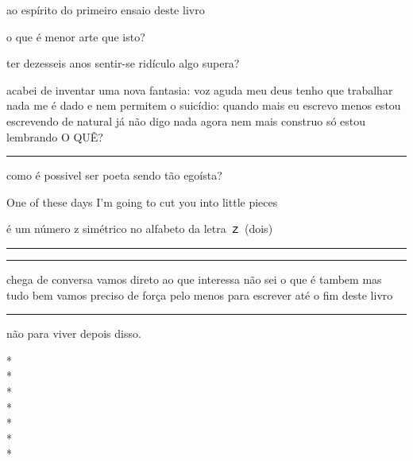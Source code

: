 \begin{poem}
\begin{stanza}
ao espírito \verseline
do primeiro ensaio\verseline
deste livro
\end{stanza}
\begin{stanza}
o que é menor arte\verseline
que isto?
\end{stanza}
\begin{stanza}
ter dezesseis anos\verseline
sentir-se ridículo\verseline
algo supera?
\end{stanza}
\begin{stanza}
acabei de inventar\verseline
uma nova fantasia:\verseline
voz aguda\verseline
meu deus\verseline
tenho que trabalhar\verseline
nada me é dado\verseline
e nem permitem\verseline
o suicídio:\verseline
\qquad quando mais eu escrevo\verseline
\qquad menos estou escrevendo\verseline
de natural já não digo nada\verseline
agora nem mais construo\verseline
\quad só estou lembrando\verseline
\qquad \qquad \qquad \qquad O QUÊ?\verseline
\rule{4cm}{0.4pt} como é\verseline
possivel ser poeta\verseline
sendo tão egoísta? \underline{ } \underline{ } \underline{ } \underline{ } \underline{ } \underline{ } \underline{ }
\end{stanza}
\clearpage
{}
\begin{stanza}
One of these days\verseline
I’m going to cut you\verseline
into little pieces
\end{stanza}
\begin{stanza}
é um número z\verseline
simétrico\verseline
no alfabeto\verseline
da letra ｚ (dois) \rule{6cm}{0.4pt}\verseline
\rule{4cm}{0.4pt} chega de conversa\verseline
vamos direto\verseline
ao que interessa\verseline
não sei o que é tambem\verseline
mas tudo bem\verseline
vamos\verseline
preciso de força\verseline
pelo menos\verseline
para escrever até o fim deste livro\verseline
\rule{2cm}{0.4pt} não para viver depois disso.
\end{stanza}
\end{poem}

\begin{center}
*\\
*\\
*\\
*\\
*\\
*\\
*
\end{center}